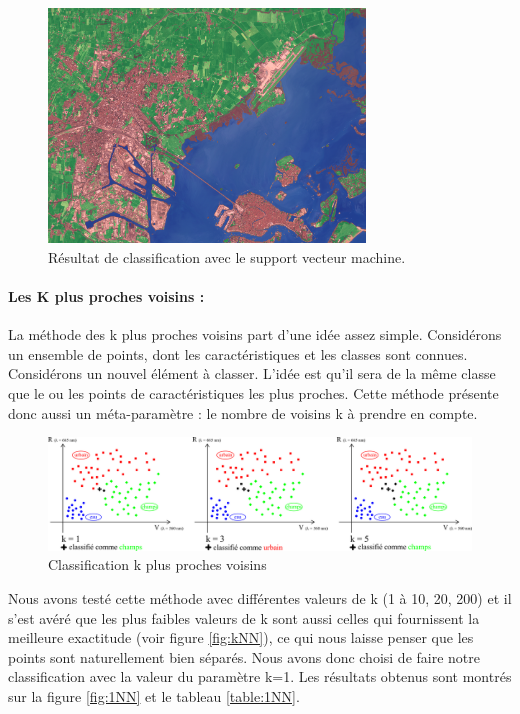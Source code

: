 \documentclass[a4paper,10pt]{report}
\begin{document}
\begin{figure}[H]
  \centering
    \includegraphics[width=0.75\textwidth]{veniseSVM}
  \caption{Résultat de classification avec le support vecteur machine.}
  \label{fig:veniseSVM}
\end{figure}


\paragraph{Les K plus proches voisins :}

La méthode des k plus proches voisins part d'une idée assez simple. Considérons un ensemble de points, dont les caractéristiques et les classes sont connues. Considérons un nouvel élément à classer. L'idée est qu'il sera de la même classe que le ou les points de caractéristiques les plus proches. Cette méthode présente donc aussi un méta-paramètre : le nombre de voisins k à prendre en compte. 

\begin{figure}[H]
  \centering
    \includegraphics[width=1.1\textwidth]{ml_knn}
  \caption{Classification k plus proches voisins}
  \label{fig:ml_knn}
\end{figure}

Nous avons testé cette méthode avec différentes valeurs de k (1 à 10, 20, 200) et il s'est avéré que les plus faibles valeurs de k sont aussi celles qui fournissent la meilleure exactitude (voir figure \ref{fig:kNN}), ce qui nous laisse penser que les points sont naturellement bien séparés. Nous avons donc choisi de faire notre classification avec la valeur du paramètre k=1. Les résultats obtenus sont montrés sur la figure \ref{fig:1NN} et le tableau \ref{table:1NN}.
\end{document}
